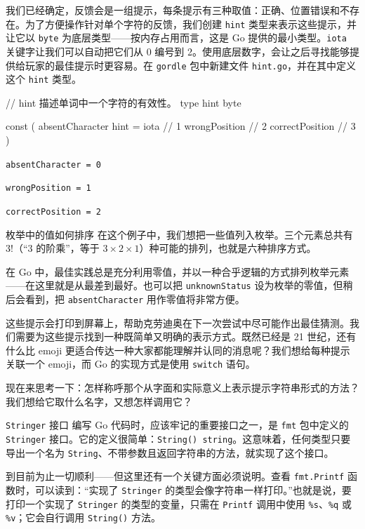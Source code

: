 我们已经确定，反馈会是一组提示，每条提示有三种取值：正确、位置错误和不存在。为了方便操作针对单个字符的反馈，我们创建 \texttt{hint} 类型来表示这些提示，并让它以 \texttt{byte} 为底层类型——按内存占用而言，这是 Go 提供的最小类型。\texttt{iota} 关键字让我们可以自动把它们从 0 编号到 2。使用底层数字，会让之后寻找能够提供给玩家的最佳提示时更容易。在 \texttt{gordle} 包中新建文件 \texttt{hint.go}，并在其中定义这个 \texttt{hint} 类型。

\begin{gocode}[title={代码清单 5.22 \texttt{hint.go}：提示字符类型和枚举}]
// hint 描述单词中一个字符的有效性。
type hint byte

const (
    absentCharacter hint = iota // 1
    wrongPosition               // 2
    correctPosition             // 3
)
\end{gocode}

\begin{codeannotations}
  \item \texttt{absentCharacter = 0}
  \item \texttt{wrongPosition = 1}
  \item \texttt{correctPosition = 2}
\end{codeannotations}

\begin{infobox}{枚举中的值如何排序}
在这个例子中，我们想把一些值列入枚举。三个元素总共有 $3!$（“3 的阶乘”，等于 $3 \times 2 \times 1$）种可能的排列，也就是六种排序方式。

在 Go 中，最佳实践总是充分利用零值，并以一种合乎逻辑的方式排列枚举元素——在这里就是从最差到最好。也可以把 \texttt{unknownStatus} 设为枚举的零值，但稍后会看到，把 \texttt{absentCharacter} 用作零值将非常方便。
\end{infobox}

这些提示会打印到屏幕上，帮助克劳迪奥在下一次尝试中尽可能作出最佳猜测。我们需要为这些提示找到一种既简单又明确的表示方式。既然已经是 21 世纪，还有什么比 emoji 更适合传达一种大家都能理解并认同的消息呢？我们想给每种提示关联一个 emoji，而 Go 的实现方式是使用 \texttt{switch} 语句。

现在来思考一下：怎样称呼那个从字面和实际意义上表示提示字符串形式的方法？我们想给它取什么名字，又想怎样调用它？

\begin{infobox}{\texttt{Stringer} 接口}
编写 Go 代码时，应该牢记的重要接口之一，是 \texttt{fmt} 包中定义的 \texttt{Stringer} 接口。它的定义很简单：\texttt{String() string}。这意味着，任何类型只要导出一个名为 \texttt{String}、不带参数且返回字符串的方法，就实现了这个接口。

到目前为止一切顺利——但这里还有一个关键方面必须说明。查看 \texttt{fmt.Printf} 函数时，可以读到：“实现了 \texttt{Stringer} 的类型会像字符串一样打印。”也就是说，要打印一个实现了 \texttt{Stringer} 的类型的变量，只需在 \texttt{Printf} 调用中使用 \texttt{\%s}、\texttt{\%q} 或 \texttt{\%v}；它会自行调用 \texttt{String()} 方法。
\end{infobox}

